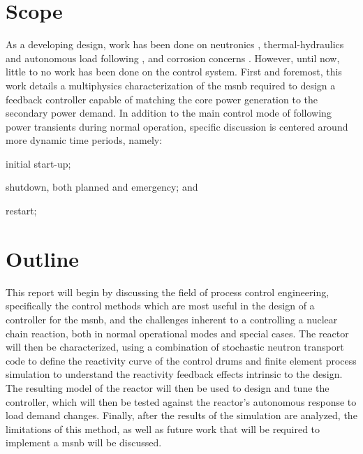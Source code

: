 \section{Scope}
As a developing design, work has been done on neutronics \cite{PetersonMS}, thermal-hydraulics and autonomous load following \cite{CarterPHD}, and corrosion concerns \cite{RoperPHD}. However, until now, little to no work has been done on the control system. First and foremost, this work details a multiphysics characterization of the \acs{msnb} required to design a feedback controller capable of matching the core power generation to the secondary power demand. In addition to the main control mode of following power transients during normal operation, specific discussion is centered around more dynamic time periods, namely: 
\begin{enumerate*}
    \item initial start-up;
    \item shutdown, both planned and emergency; and
    \item restart;
\end{enumerate*}


\section{Outline}
This report will begin by discussing the field of process control engineering, specifically the control methods which are most useful in the design of a controller for the \acs{msnb}, and the challenges inherent to a controlling a nuclear chain reaction, both in normal operational modes and special cases. The reactor will then be characterized, using a combination of stochastic neutron transport code to define the reactivity curve of the control drums and finite element process simulation to understand the reactivity feedback effects intrinsic to the design. The resulting model of the reactor will then be used to design and tune the controller, which will then be tested against the reactor's autonomous response to load demand changes. Finally, after the results of the simulation are analyzed, the limitations of this method, as well as future work that will be required to implement a \acl{msnb} will be discussed.   
